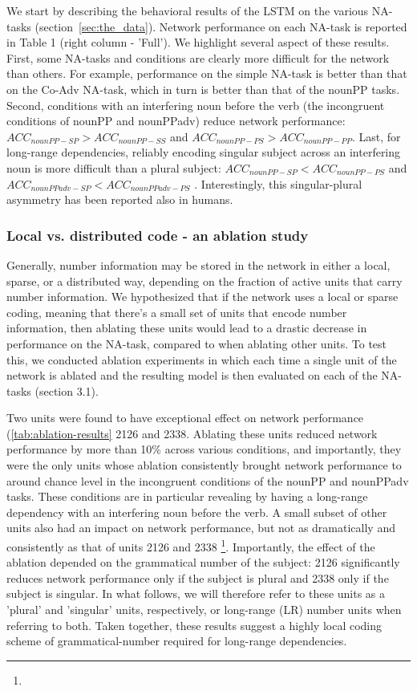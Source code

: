We start by describing the behavioral results of the LSTM on the various NA-tasks (section~\ref{sec:the_data}). Network performance on each NA-task is reported in Table 1 (right column - 'Full'). We highlight several aspect of these results. First, some NA-tasks and conditions are clearly more difficult for the network than others. For example, performance on the simple NA-task is better than that on the Co-Adv NA-task, which in turn is better than that of the nounPP tasks. Second, conditions with an interfering noun before the verb (the incongruent conditions of nounPP and nounPPadv) reduce network performance: $ACC_{nounPP-SP}>ACC_{nounPP-SS}$ and $ACC_{nounPP-PS}>ACC_{nounPP-PP}$. Last, for long-range dependencies, reliably encoding singular subject across an interfering noun is more difficult than a plural subject: $ACC_{nounPP-SP}<ACC_{nounPP-PS}$ and $ACC_{nounPPadv-SP}<ACC_{nounPPadv-PS}$ . Interestingly, this singular-plural asymmetry has been reported also in humans. 

\subsubsection{Local vs. distributed code - an ablation study}
Generally, number information may be stored in the network in either a local, sparse, or a distributed way, depending on the fraction of active units that carry number information. 
We hypothesized that if the network uses a local or sparse coding, meaning that there's a small set of units that encode number information, then ablating these units would lead to a drastic decrease in performance on the NA-task, compared to when ablating other units. 
To test this, we conducted ablation experiments in which each time a single unit of the network is ablated and the resulting model is then evaluated on each of the NA-tasks (section 3.1). 

Two units were found to have exceptional effect on network performance (\ref{tab:ablation-results} \unit{2}{126} and \unit{2}{338}. Ablating these units reduced network performance by more than 10\% across various conditions, and importantly, they were the only units whose ablation consistently brought network performance to around chance level in the incongruent conditions of the nounPP and nounPPadv tasks. These conditions are in particular revealing by having a long-range dependency with an interfering noun before the verb. A small subset of other units also had an impact on network performance, but not as dramatically and consistently as that of units \unit{2}{126} and \unit{2}{338} \footnote{}. Importantly, the effect of the ablation depended on the grammatical number of the subject: \unit{2}{126} significantly reduces network performance only if the subject is plural and \unit{2}{338} only if the subject is singular. In what follows, we will therefore refer to these units as a 'plural' and 'singular' units, respectively, or long-range (LR) number units when referring to both. Taken together, these results suggest a highly local coding scheme of grammatical-number required for long-range dependencies. 

